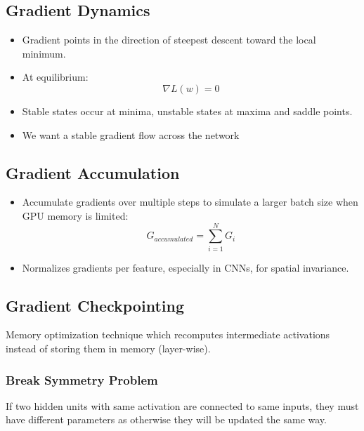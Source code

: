 \documentclass[12pt,a4paper]{article}
\begin{document}
\subsection{Gradient Dynamics}
\begin{itemize}
    \item Gradient points in the direction of steepest descent toward the local minimum.
    \item At equilibrium:
    \[ \nabla L(w) = 0 \]
    \item Stable states occur at minima, unstable states at maxima and saddle points.
    \item We want a stable gradient flow across the network 
\end{itemize}

\subsection{Gradient Accumulation}
\begin{itemize}
    \item Accumulate gradients over multiple steps to simulate a larger batch size when GPU memory is limited:
    \[ G_{accumulated} = \sum_{i=1}^N G_i \]
    \item Normalizes gradients per feature, especially in CNNs, for spatial invariance.
\end{itemize}
\subsection{Gradient Checkpointing}
Memory optimization technique which recomputes intermediate activations instead of storing them in memory (layer-wise).
\subsubsection{Break Symmetry Problem}
If two hidden units with same activation are connected to same inputs, they must have different parameters as otherwise they will be updated the same way.
\end{document}
